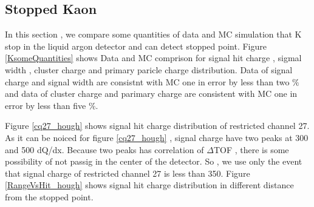 \subsection{Stopped Kaon}
In this section , we compare some quantities of data and MC simulation that K stop in the liquid argon detector and can detect stopped point.
Figure \ref{KsomeQuantities} shows Data and MC comprison for signal hit charge , sigmal width , cluster charge and primary paricle charge distribution.
Data of signal charge and signal width are consistnt with MC one in error by less than two $\%$ and data of cluster charge and parimary charge are consistent with  MC one in error by less than five $\%$.

Figure \ref{cq27_hough} shows signal hit charge distribution of restricted channel 27. 
As it can be noiced for figure \ref{cq27_hough} , signal charge have two peaks at 300 and 500 dQ/dx.
Because two peaks has correlation of $\Delta$TOF , there is some possibility of not passig in the center of the detector.
So , we use only the event that signal charge of restricted channel 27 is less than 350.
Figure \ref{RangeVsHit_hough} shows signal hit charge distribution in different distance from the stopped point.

